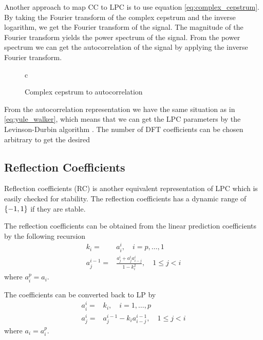 Another approach to map CC to LPC is to use equation \eqref{eq:complex_cepstrum}. By taking the Fourier transform of the complex cepstrum and the inverse logarithm, we get the Fourier transform of the signal. The magnitude of the Fourier transform yields the power spectrum of the signal. From the power spectrum we can get the autocorrelation of the signal by applying the inverse Fourier transform.
\begin{figure}[htbp]
  \centering
  \begin{tabular}[h]{c}
  \end{tabular}
  \caption{Complex cepstrum to autocorrelation}
  \label{fig:cc2ar}
\end{figure}
From the autocorrelation representation we have the same situation as in \eqref{eq:yule_walker}, which means that we can get the LPC parameters by the Levinson-Durbin algorithm \cite{cybenko80}. The number of DFT coefficients can be chosen arbitrary to get the desired 


\subsection{Reflection Coefficients} %
\label{sub:reflection_coefficients}
Reflection coefficients (RC) is another equivalent representation of LPC which is easily checked for stability. The reflection coefficients has a dynamic range of $\lbrace-1,1\rbrace$ if they are stable. 

The reflection coefficients can be obtained from the linear prediction coefficients by the following recursion
\begin{equation}
	\label{eq:ar2rf}
	\begin{split}
		k_i = & a_i^i, \quad i=p,\dotsc,1 \\
		a_j^{i-1} = & \frac{a_j^i+a_j^î a_{i-j}^i}{1-k_i^2}, \quad 1\leq j<i
	\end{split}
\end{equation}
where $a_i^p=a_i$.

The coefficients can be converted back to LP by \cite{taletek}
\begin{equation}
	\label{eq:rf2ar}
	\begin{split}
		a_i^i = & k_i, \quad i=1,\dotsc,p \\
		a_j^i = & a_j^{i-1}-k_i a_{i-j}^{i-1}, \quad 1\leq j<i
	\end{split}
\end{equation}
where $a_i=a_i^p$.

